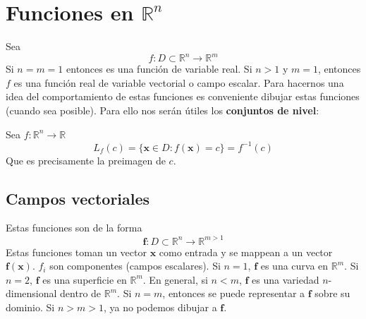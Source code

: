 \documentclass{../Calculo.tex}
\begin{document}
\section{Funciones en $\mathbb{R}^{n}$ }
Sea
$$
f:D \subset \mathbb{R}^n\to \mathbb{R}^m
$$
Si $n=m=1$ entonces es una función de variable real. Si $n>1$ y $m=1$, entonces $f$ es una función real de variable vectorial o campo escalar.
Para hacernos una idea del comportamiento de estas funciones es conveniente dibujar estas funciones (cuando sea posible). Para ello nos serán útiles los \textbf{conjuntos de nivel}:
\begin{defin}
Sea $f: \mathbb{R}^{n}\to \mathbb{R}$
$$
L_{f}(c)=\{ \mathbf{x}\in D : f(\mathbf{x})=c \}=f^{-1}(c)
$$
Que es precisamente la preimagen de $c$.
\end{defin}
\subsection{Campos vectoriales}
Estas funciones son de la forma
$$
\mathbf{f}: D \subset \mathbb{R}^{n} \to \mathbb{R}^{m>1}
$$
Estas funciones toman un vector $\mathbf{x}$ como entrada y se mappean a un vector $\mathbf{f}(\mathbf{x})$.
$f_{i}$ son componentes (campos escalares).
Si $n=1$, $\mathbf{f}$ es una curva en $\mathbb{R}^{m}$.
Si $n=2$, $\mathbf{f}$ es una superficie en $\mathbb{R}^{m}$.
En general, si $n<m$, $\mathbf{f}$ es una variedad $n$-dimensional dentro de $\mathbb{R}^{m}$.
Si $n=m$, entonces se puede representar a $\mathbf{f}$ sobre su dominio.
Si $n > m > 1$, ya no podemos dibujar a $\mathbf{f}$.
\end{document}
